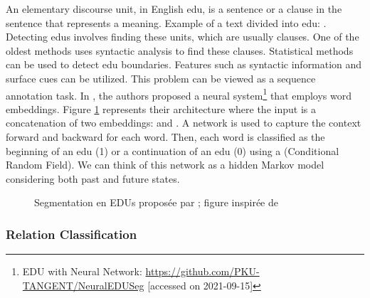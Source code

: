 \documentclass{KBook}
\begin{document}
An elementary discourse unit, in English \ac{edu}, is a sentence or a clause in the sentence that represents a meaning. Example of a text divided into \ac{edu}: . Detecting \ac{edu}s involves finding these units, which are usually clauses. One of the oldest methods uses syntactic analysis to find these clauses. Statistical methods can be used to detect \ac{edu} boundaries. Features such as syntactic information and surface cues can be utilized. This problem can be viewed as a sequence annotation task. In \cite{2018-wang-al}, the authors proposed a neural system\footnote{EDU with Neural Network: \url{https://github.com/PKU-TANGENT/NeuralEDUSeg} [accessed on 2021-09-15]} that employs word embeddings. Figure \ref{fig:edu-embedding} represents their architecture where the input is a concatenation of two embeddings:  and . A  network is used to capture the context forward and backward for each word. Then, each word is classified as the beginning of an \ac{edu} (1) or a continuation of an \ac{edu} (0) using a  (Conditional Random Field). We can think of this network as a hidden Markov model considering both past and future states.

\begin{figure}[!ht]
	\centering
	\caption[Segmentation en EDUs par embeddings]{Segmentation en EDUs proposée par \citet{2018-wang-al} ; figure inspirée de \cite{2019-jurafsky-martin}}
	\label{fig:edu-embedding}
\end{figure}


\subsubsection{Relation Classification}
\end{document}

